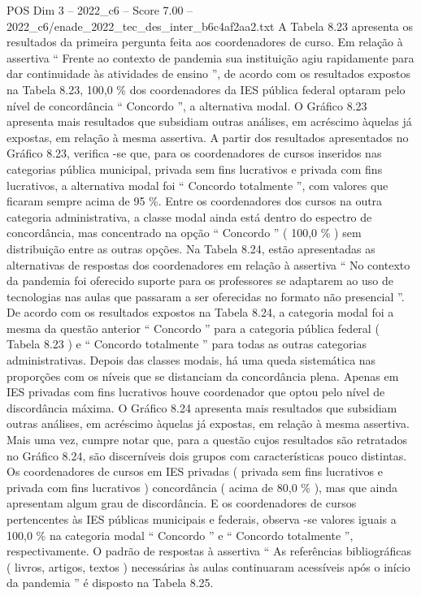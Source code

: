 \begin{textsample}{POS Dim 3 – 2022\_c6 – Score 7.00 – 2022\_c6/enade\_2022\_tec\_des\_inter\_b6c4af2aa2.txt}
A Tabela 8.23 apresenta os resultados da primeira pergunta feita aos coordenadores de curso.
Em relação à assertiva “ Frente ao contexto de pandemia sua instituição agiu rapidamente para dar continuidade às atividades de ensino ”, de acordo com os resultados expostos na Tabela 8.23, 100,0 \% dos coordenadores da IES pública federal optaram pelo nível de concordância “ Concordo ”, a alternativa modal.
O Gráfico 8.23 apresenta mais resultados que subsidiam outras análises, em acréscimo àquelas já expostas, em relação à mesma assertiva.
A partir dos resultados apresentados no Gráfico 8.23, verifica -se que, para os coordenadores de cursos inseridos nas categorias pública municipal, privada sem fins lucrativos e privada com fins lucrativos, a alternativa modal foi “ Concordo totalmente ”, com valores que ficaram sempre acima de 95 \%.
Entre os coordenadores dos cursos na outra categoria administrativa, a classe modal ainda está dentro do espectro de concordância, mas concentrado na opção “ Concordo ” ( 100,0 \% ) sem distribuição entre as outras opções.
Na Tabela 8.24, estão apresentadas as alternativas de respostas dos coordenadores em relação à assertiva “ No contexto da pandemia foi oferecido suporte para os professores se adaptarem ao uso de tecnologias nas aulas que passaram a ser oferecidas no formato não presencial ”.
De acordo com os resultados expostos na Tabela 8.24, a categoria modal foi a mesma da questão anterior “ Concordo ” para a categoria pública federal ( Tabela 8.23 ) e “ Concordo totalmente ” para todas as outras categorias administrativas.
Depois das classes modais, há uma queda sistemática nas proporções com os níveis que se distanciam da concordância plena.
Apenas em IES privadas com fins lucrativos houve coordenador que optou pelo nível de discordância máxima.
O Gráfico 8.24 apresenta mais resultados que subsidiam outras análises, em acréscimo àquelas já expostas, em relação à mesma assertiva.
Mais uma vez, cumpre notar que, para a questão cujos resultados são retratados no Gráfico 8.24, são discerníveis dois grupos com características pouco distintas.
Os coordenadores de cursos em IES privadas ( privada sem fins lucrativos e privada com fins lucrativos ) concordância ( acima de 80,0 \% ), mas que ainda apresentam algum grau de discordância.
E os coordenadores de cursos pertencentes às IES públicas municipais e federais, observa -se valores iguais a 100,0 \% na categoria modal “ Concordo ” e “ Concordo totalmente ”, respectivamente.
O padrão de respostas à assertiva “ As referências bibliográficas ( livros, artigos, textos ) necessárias às aulas continuaram acessíveis após o início da pandemia ” é disposto na Tabela 8.25.

\end{textsample}
